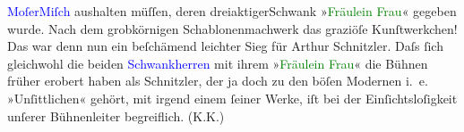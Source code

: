                   \textcolor{blue}{Moſer}{}\ledrightnote{\textcolor{blue}{Gustav von Moser}}{ }{\kaufmannsund}{ }\textcolor{blue}{Miſch}{}\ledrightnote{\textcolor{blue}{Robert Misch}} aushalten müſſen, deren \introOben{}dreiaktiger\introOben{}{ }Schwank »\textcolor{green}{Fräulein
                  Frau}{}\ledrightnote{\textcolor{green}{Fräulein Frau}}« gegeben wurde. Nach dem grobkörnigen Schablonenmachwerk das graziöſe
               Kunſtwerkchen! Das war denn nun ein beſchämend leichter Sieg für Arthur Schnitzler.
               Daſs ſich gleichwohl die beiden \textcolor{blue}{Schwankherren}{} mit ihrem »\textcolor{green}{Fräulein Frau}{}\ledrightnote{\textcolor{green}{Fräulein Frau}}« die Bühnen früher erobert haben als Schnitzler, der ja doch
               zu den böſen Modernen i. e. »Unſittlichen« gehört, mit irgend einem ſeiner Werke, iſt
               bei der Einſichtsloſigkeit unſerer Bühnenleiter begreiflich. \spacefill\mbox{(K.K.)}\pend
           \endnumbering{}  
      